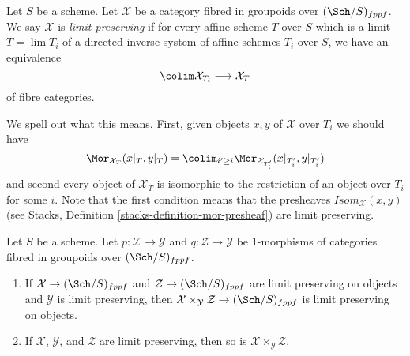 \begin{definition}
\label{definition-limit-preserving}
Let $S$ be a scheme. Let $\mathcal{X}$ be a category fibred in groupoids
over $(\Sch/S)_{fppf}$. We say $\mathcal{X}$ is {\it limit preserving}
if for every affine scheme $T$ over $S$ which is a limit $T = \lim T_i$
of a directed inverse system of affine schemes $T_i$ over $S$, we have
an equivalence
$$
\colim \mathcal{X}_{T_i} \longrightarrow \mathcal{X}_T
$$
of fibre categories.
\end{definition}

\noindent
We spell out what this means. First, given objects $x, y$ of $\mathcal{X}$
over $T_i$ we should have
$$
\Mor_{\mathcal{X}_T}(x|_T, y|_T) =
\colim_{i' \geq i} \Mor_{\mathcal{X}_{T_i'}}(x|_{T_i'}, y|_{T_i'})
$$
and second every object of $\mathcal{X}_T$ is isomorphic to the restriction
of an object over $T_i$ for some $i$. Note that the first condition means
that the presheaves $\mathit{Isom}_\mathcal{X}(x, y)$ (see
Stacks, Definition \ref{stacks-definition-mor-presheaf})
are limit preserving.

\begin{lemma}
\label{lemma-fibre-product-limit-preserving}
Let $S$ be a scheme. Let $p : \mathcal{X} \to \mathcal{Y}$ and
$q : \mathcal{Z} \to \mathcal{Y}$ be $1$-morphisms of categories
fibred in groupoids over $(\Sch/S)_{fppf}$.
\begin{enumerate}
\item If $\mathcal{X} \to (\Sch/S)_{fppf}$ and
$\mathcal{Z} \to (\Sch/S)_{fppf}$ are limit preserving on objects and
$\mathcal{Y}$ is limit preserving, then
$\mathcal{X} \times_\mathcal{Y} \mathcal{Z} \to (\Sch/S)_{fppf}$ is
limit preserving on objects.
\item If $\mathcal{X}$, $\mathcal{Y}$,
and $\mathcal{Z}$ are limit preserving, then so
is $\mathcal{X} \times_\mathcal{Y} \mathcal{Z}$.
\end{enumerate}
\end{lemma}

